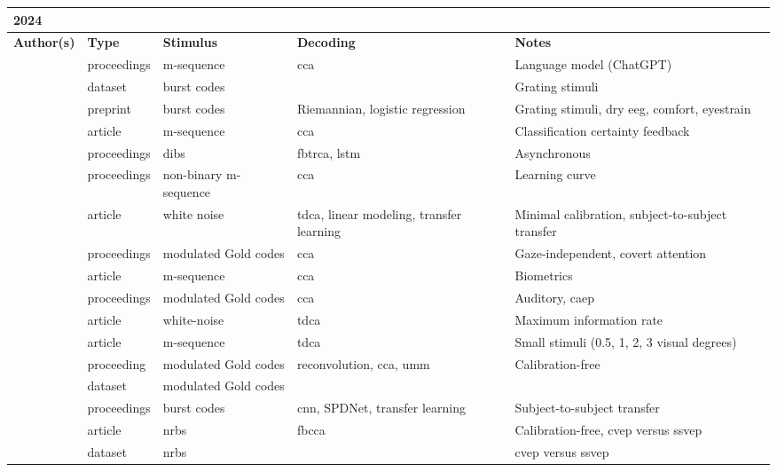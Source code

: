 \documentclass[a4paper,landscape]{article}
\begin{document}
	
\begin{table}[H]
	\begin{tabular}{p{5cm}p{2cm}p{5cm}p{5cm}p{6.5cm}}
		\textbf{2024} & & & & \\ 
		\toprule
		\textbf{Author(s)} & \textbf{Type} & \textbf{Stimulus} & \textbf{Decoding} & \textbf{Notes} \\ 
		\midrule
		\citeauthor{canturk2024} & proceedings & m-sequence & \acrshort{cca} & Language model (ChatGPT) \\
		\citeauthor{castillos2024dataset} & dataset & burst codes & & Grating stimuli \\
		\citeauthor{dehais2024} & preprint & burst codes & Riemannian, logistic regression & Grating stimuli, dry \acrshort{eeg}, comfort, eyestrain \\
		\citeauthor{fodor2024} & article & m-sequence & \acrshort{cca} & Classification certainty feedback \\
		\citeauthor{lai2024} & proceedings & \acrshort{dibs} & \acrfull{fbtrca}, \acrshort{lstm} & Asynchronous \\
		\citeauthor{martinez2024} & proceedings & non-binary m-sequence & \acrshort{cca} & Learning curve \\
		\citeauthor{miao2024} & article & white noise & \acrshort{tdca}, linear modeling, transfer learning & Minimal calibration, subject-to-subject transfer \\
		\citeauthor{narayanan2024} & proceedings & modulated Gold codes & \acrshort{cca} & Gaze-independent, covert attention \\
		\citeauthor{qu2024} & article & m-sequence & \acrshort{cca} & Biometrics \\
		\citeauthor{scheppink2024} & proceedings & modulated Gold codes & \acrshort{cca} & Auditory, \acrshort{caep} \\
		\citeauthor{shi2024} & article & white-noise & \acrshort{tdca} & Maximum information rate \\
		\citeauthor{sun2024} & article & m-sequence & \acrshort{tdca} & Small stimuli (0.5, 1, 2, 3 visual degrees) \\
		\citeauthor{thielen2024} & proceeding & modulated Gold codes & reconvolution, \acrshort{cca}, \acrshort{umm} & Calibration-free \\
		\citeauthor{thielen2024dataset} & dataset & modulated Gold codes & & \\
		\citeauthor{velut2024} & proceedings & burst codes & \acrshort{cnn}, SPDNet, transfer learning & Subject-to-subject transfer \\
		\citeauthor{zheng2024a} & article & \acrshort{nrbs} & \acrshort{fbcca} & Calibration-free, \acrshort{cvep} versus \acrshort{ssvep} \\
		\citeauthor{zheng2024b} & dataset & \acrshort{nrbs} & & \acrshort{cvep} versus \acrshort{ssvep} \\
		\bottomrule
	\end{tabular}
\end{table}
\end{document}
